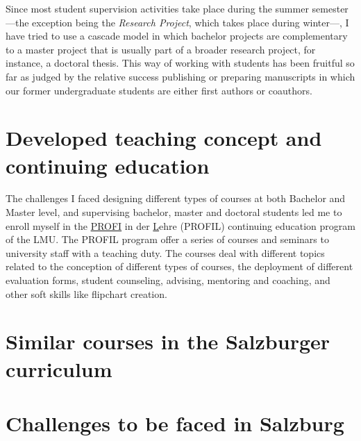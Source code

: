 \documentclass[a4paper,11pt]{article}
\begin{document}

Since most student supervision activities take place during the summer semester ---the exception being the \emph{Research Project}, which takes place during winter---, I have tried to use a cascade model in which bachelor projects are complementary to a master project that is usually part of a broader research project, for instance, a doctoral thesis. This way of working with students has been fruitful so far as judged by the relative success publishing or preparing manuscripts in which our former undergraduate students are either first authors or coauthors.

\section*{Developed teaching concept and continuing education}

The challenges I faced designing different types of courses at both Bachelor and Master level, and supervising bachelor, master and doctoral students led me to enroll myself in the \underline{PROFI} in der \underline{L}ehre (PROFIL) continuing education program of the LMU. The PROFIL program offer a series of courses and seminars to university staff with a teaching duty. The courses deal with different topics related to the conception of different types of courses, the deployment of different evaluation forms, student counseling, advising, mentoring and coaching, and other soft skills like flipchart creation.

\section*{Similar courses in the Salzburger curriculum}


\section*{Challenges to be faced in Salzburg}


\end{document}
